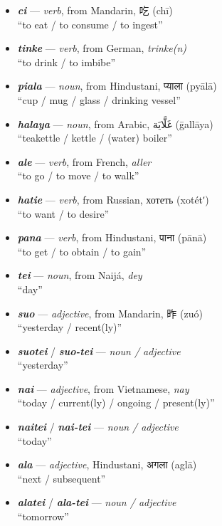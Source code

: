 \documentclass[a4paper]{article}
\begin{document}
\begin{itemize}
	\item \textbf{\textit{ci}} — \textit{verb}, from Mandarin, 吃 (chī) \\``to eat / to consume / to ingest''
	\item \textbf{\textit{tinke}} — \textit{verb}, from German, \textit{trinke(n)} \\``to drink / to imbibe''
	\item \textbf{\textit{piala}} — \textit{noun}, from Hindustani, {\hmfont  प्याला} (pyālā) \\ ``cup / mug / glass / drinking vessel''
	\item \textbf{\textit{halaya}} — \textit{noun}, from Arabic, {\afont  غَلَّايَة } (ḡallāya) \\ ``teakettle / kettle / (water) boiler''
	\item \textbf{\textit{ale}} — \textit{verb}, from French, \textit{aller} \\``to go / to move / to walk''
	\item \textbf{\textit{hatie}} — \textit{verb}, from Russian, хотеть (xotétʹ) \\ ``to want / to desire''
	\item \textbf{\textit{pana}} — \textit{verb}, from Hindustani, {\hmfont पाना} (pānā) \\ ``to get / to obtain / to gain''
	\item \textbf{\textit{tei}} — \textit{noun}, from Naijá, \textit{dey} \\ ``day''
	\item \textbf{\textit{suo}} — \textit{adjective}, from Mandarin, 昨 (zuó) \\ ``yesterday / recent(ly)''
	\item \textbf{\textit{suotei}} / \textbf{\textit{suo-tei}} — \textit{noun /  adjective} \\ ``yesterday''
	\item \textbf{\textit{nai}} — \textit{adjective}, from Vietnamese, \textit{nay} \\ ``today / current(ly) / ongoing / present(ly)''
	\item \textbf{\textit{naitei}} / \textbf{\textit{nai-tei}} — \textit{noun /  adjective} \\ ``today''
	\item \textbf{\textit{ala}} — \textit{adjective}, Hindustani, {\hmfont अगला} (aglā) \\ ``next / subsequent''
	\item \textbf{\textit{alatei}} / \textbf{\textit{ala-tei}} — \textit{noun /  adjective} \\ ``tomorrow''

\end{itemize}
\end{document}
